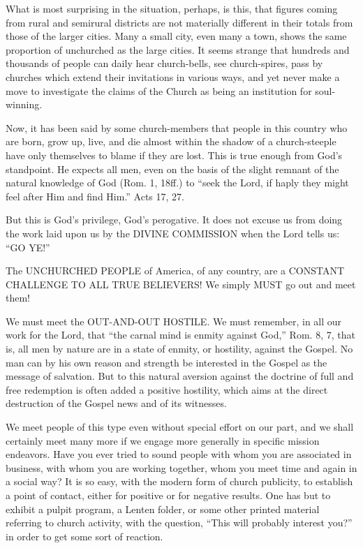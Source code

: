 \documentclass[
]{book}
\begin{document}
What is most surprising in the situation, perhaps, is this, that figures coming from rural and semirural districts are not materially different in their totals from those of the larger cities. Many a small city, even many a town, shows the same proportion of unchurched as the large cities. It seems strange that hundreds and thousands of people can daily hear church-bells, see church-spires, pass by churches which extend their invitations in various ways, and yet never make a move to investigate the claims of the Church as being an institution for soul-winning.

Now, it has been said by some church-members that people in this country who are born, grow up, live, and die almost within the shadow of a church-steeple have only themselves to blame if they are lost. This is true enough from God's standpoint. He expects all men, even on the basis of the slight remnant of the natural knowledge of God (Rom. 1, 18ff.) to ``seek the Lord, if haply they might feel after Him and find Him.'' Acts 17, 27.

But this is God's privilege, God's perogative. It does not excuse us from doing the work laid upon us by the DIVINE COMMISSION when the Lord tells us: ``GO YE!''

The UNCHURCHED PEOPLE of America, of any country, are a CONSTANT CHALLENGE TO ALL TRUE BELIEVERS! We simply MUST go out and meet them!

We must meet the OUT-AND-OUT HOSTILE. We must remember, in all our work for the Lord, that ``the carnal mind is enmity against God,'' Rom. 8, 7, that is, all men by nature are in a state of enmity, or hostility, against the Gospel. No man can by his own reason and strength be interested in the Gospel as the message of salvation. But to this natural aversion against the doctrine of full and free redemption is often added a positive hostility, which aims at the direct destruction of the Gospel news and of its witnesses.

We meet people of this type even without special effort on our part, and we shall certainly meet many more if we engage more generally in specific mission endeavors. Have you ever tried to sound people with whom you are associated in business, with whom you are working together, whom you meet time and again in a social way? It is so easy, with the modern form of church publicity, to establish a point of contact, either for positive or for negative results. One has but to exhibit a pulpit program, a Lenten folder, or some other printed material referring to church activity, with the question, ``This will probably interest you?'' in order to get some sort of reaction.
\end{document}
